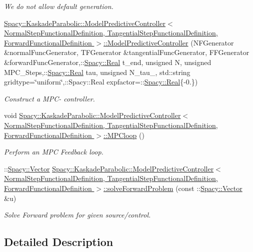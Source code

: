\begin{DoxyCompactItemize}
\begin{DoxyCompactList}\small\item\em We do not allow default generation. \end{DoxyCompactList}\item 
\hyperlink{group__KaskadeParabolicGroup_ga94abd500e2d7bb0711e2bd2997ac3b0c}{Spacy\-::\-Kaskade\-Parabolic\-::\-Model\-Predictive\-Controller$<$ Normal\-Step\-Functional\-Definition, Tangential\-Step\-Functional\-Definition, Forward\-Functional\-Definition $>$\-::\-Model\-Predictive\-Controller} (N\-F\-Generator \&normal\-Func\-Generator, T\-F\-Generator \&tangential\-Func\-Generator, F\-F\-Generator \&forward\-Func\-Generator,\-::\hyperlink{classSpacy_1_1Real}{Spacy\-::\-Real} t\-\_\-end, unsigned N, unsigned M\-P\-C\-\_\-\-Steps,\-::\hyperlink{classSpacy_1_1Real}{Spacy\-::\-Real} tau, unsigned N\-\_\-tau\-\_\-, std\-::string gridtype=\char`\"{}uniform\char`\"{},\-::Spacy\-::\-Real expfactor=\-::\hyperlink{classSpacy_1_1Real}{Spacy\-::\-Real}\{-\/0.\})
\begin{DoxyCompactList}\small\item\em Construct a M\-P\-C-\/ controller. \end{DoxyCompactList}\item 
void \hyperlink{group__KaskadeParabolicGroup_ga5ec38126a42c548b1d08f0d96708bbbd}{Spacy\-::\-Kaskade\-Parabolic\-::\-Model\-Predictive\-Controller$<$ Normal\-Step\-Functional\-Definition, Tangential\-Step\-Functional\-Definition, Forward\-Functional\-Definition $>$\-::\-M\-P\-Cloop} ()
\begin{DoxyCompactList}\small\item\em Perform an M\-P\-C Feedback loop. \end{DoxyCompactList}\item 
\-::\hyperlink{classSpacy_1_1Vector}{Spacy\-::\-Vector} \hyperlink{group__KaskadeParabolicGroup_ga1a532fdeab463607601829afd5091a11}{Spacy\-::\-Kaskade\-Parabolic\-::\-Model\-Predictive\-Controller$<$ Normal\-Step\-Functional\-Definition, Tangential\-Step\-Functional\-Definition, Forward\-Functional\-Definition $>$\-::solve\-Forward\-Problem} (const \-::\hyperlink{classSpacy_1_1Vector}{Spacy\-::\-Vector} \&u)
\begin{DoxyCompactList}\small\item\em Solve Forward problem for given source/control. \end{DoxyCompactList}\end{DoxyCompactItemize}


\subsection{Detailed Description}


